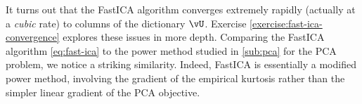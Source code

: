 \documentclass[../../book-main.tex]{subfiles}
\begin{document}
It turns out that the FastICA algorithm converges extremely rapidly (actually at a \textit{cubic} rate) to columns of the dictionary $\vU$. 
Exercise \ref{exercise:fast-ica-convergence} explores these issues in more depth.  %
Comparing the FastICA algorithm \eqref{eq:fast-ica} to the power method studied in \ref{sub:pca} for the PCA problem, we notice a striking similarity. Indeed, FastICA is essentially a modified power method, involving the gradient of the empirical kurtosis rather than the simpler linear gradient of the PCA objective.







%
\end{document}
